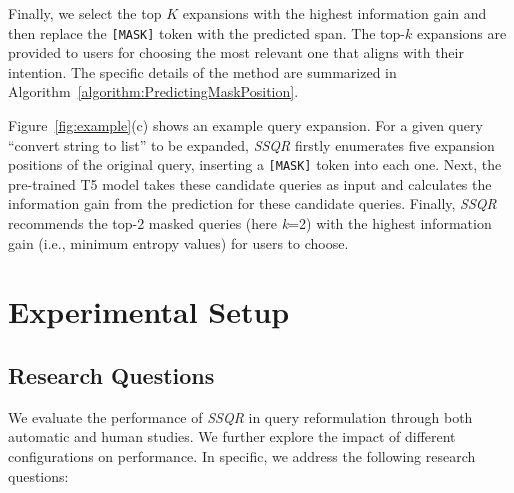 \documentclass[sigconf,screen]{acmart}
\newcommand{\ie}{\hbox{i.e.}\xspace}
\newcommand{\ourmethod}{\textit{SSQR}\xspace}
\begin{document}
Finally, we select the top $K$ expansions with the highest information gain and then replace the \texttt{[MASK]} token with the predicted span. The top-$k$ expansions are provided to users for choosing the most relevant one that aligns with their intention. 
The specific details of the method are summarized in Algorithm~\ref{algorithm:PredictingMaskPosition}.

Figure~\ref{fig:example}(c) shows an example query expansion. For a given query ``convert string to list'' to be expanded, \ourmethod firstly enumerates five expansion positions of the original query, inserting a \texttt{[MASK]} token into each one. Next, the pre-trained T5 model takes these candidate queries as input and calculates the information gain from the prediction for these candidate queries. Finally, \ourmethod recommends the top-2 masked queries (here \textit{k}=2) with the highest information gain (\ie, minimum entropy values) for users to choose. 


\section{Experimental Setup}

\subsection{Research Questions}
We evaluate the performance of \ourmethod in query reformulation through both automatic and human studies. We further explore the impact of different configurations on performance. %
In specific, we address the following research questions:
\end{document}
